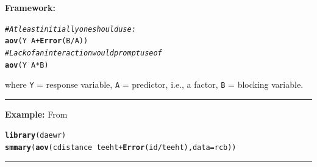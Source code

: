 \documentclass[12pt,english]{article}\usepackage[]{graphicx}\usepackage[table]{xcolor}
\makeatletter
\newcommand{\hlcom}[1]{\textcolor[rgb]{0.678,0.584,0.686}{\textit{#1}}}%
\newcommand{\hlopt}[1]{\textcolor[rgb]{0,0,0}{#1}}%
\newcommand{\hldef}[1]{\textcolor[rgb]{0.345,0.345,0.345}{#1}}%
\newcommand{\hlkwc}[1]{\textcolor[rgb]{0.333,0.667,0.333}{#1}}%
\newcommand{\hlkwd}[1]{\textcolor[rgb]{0.737,0.353,0.396}{\textbf{#1}}}%
\newenvironment{kframe}{%
 \def\at@end@of@kframe{}%
 \ifinner\ifhmode%
  \def\at@end@of@kframe{\end{minipage}}%
  \begin{minipage}{\columnwidth}%
 \fi\fi%
 \def\FrameCommand##1{\hskip\@totalleftmargin \hskip-\fboxsep
 \colorbox{shadecolor}{##1}\hskip-\fboxsep
     \hskip-\linewidth \hskip-\@totalleftmargin \hskip\columnwidth}%
 \MakeFramed {\advance\hsize-\width
   \@totalleftmargin\z@ \linewidth\hsize
   \@setminipage}}%
 {\par\unskip\endMakeFramed%
 \at@end@of@kframe}
\newenvironment{knitrout}{}{} %
\makeatother
\begin{document}
\begin{tcolorbox}[colback=yellow!50!red!25!white,colbacktitle=yellow!50!red,colframe=black!75!white,title=\textbf{R:} GCB]
\textbf{Framework:}\\
\vspace{-.2in}
\begin{knitrout}
\color{fgcolor}\begin{kframe}
\begin{alltt}
\hlcom{# At least initially one should use:}
\hlkwd{aov}\hldef{(Y} \hlopt{~} \hldef{A} \hlopt{+} \hlkwd{Error}\hldef{(B}\hlopt{/}\hldef{A))}
\hlcom{# Lack of an interaction would prompt use of}
\hlkwd{aov}\hldef{(Y} \hlopt{~} \hldef{A} \hlopt{*} \hldef{B)}
\end{alltt}
\end{kframe}
\end{knitrout}

where \texttt{Y} = response variable, \texttt{A} = predictor, i.e., a factor, \texttt{B} = blocking variable.
\vspace{0.1in}
\par\noindent\rule{.9\textwidth}{0.4pt}

\textbf{Example:} From \citep[][pgs 125-128]{lawson}
\vspace{-.1in}
\begin{knitrout}
\color{fgcolor}\begin{kframe}
\begin{alltt}
\hlkwd{library}\hldef{(daewr)}
\hlkwd{smmary}\hldef{(}\hlkwd{aov}\hldef{(cdistance} \hlopt{~} \hldef{teeht} \hlopt{+} \hlkwd{Error}\hldef{(id}\hlopt{/}\hldef{teeht),} \hlkwc{data} \hldef{= rcb))}
\end{alltt}
\end{kframe}
\end{knitrout}
\end{tcolorbox}
\par\noindent\rule{.9\textwidth}{0.4pt}
\end{document}
